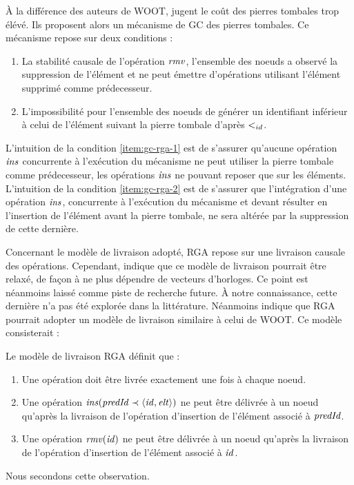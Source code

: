 À la différence des auteurs de WOOT, \textcite{ROH2011354} jugent le coût des pierres tombales trop élévé.
Ils proposent alors un mécanisme de \ac{GC} des pierres tombales.
Ce mécanisme repose sur deux conditions :
\begin{enumerate}[label=(\roman*)]
  \item \label{item:gc-rga-1}
    La stabilité causale de l'opération $\mathit{rmv}$, \ie l'ensemble des noeuds a observé la suppression de l'élément et ne peut émettre d'opérations utilisant l'élément supprimé comme prédecesseur.
  \item \label{item:gc-rga-2}
    L'impossibilité pour l'ensemble des noeuds de générer un identifiant inférieur à celui de l'élément suivant la pierre tombale d'après $<_{id}$.
\end{enumerate}
L'intuition de la condition \ref{item:gc-rga-1} est de s'assurer qu'aucune opération $\mathit{ins}$ concurrente à l'exécution du mécanisme ne peut utiliser la pierre tombale comme prédecesseur, les opérations $\mathit{ins}$ ne pouvant reposer que sur les éléments.
L'intuition de la condition \ref{item:gc-rga-2} est de s'assurer que l'intégration d'une opération $\mathit{ins}$, concurrente à l'exécution du mécanisme et devant résulter en l'insertion de l'élément avant la pierre tombale, ne sera altérée par la suppression de cette dernière.

Concernant le modèle de livraison adopté, \ac{RGA} repose sur une livraison causale des opérations.
Cependant, \cite{ROH2011354} indique que ce modèle de livraison pourrait être relaxé, de façon à ne plus dépendre de vecteurs d'horloges.
Ce point est néanmoins laissé comme piste de recherche future.
À notre connaissance, cette dernière n'a pas été explorée dans la littérature.
Néanmoins \textcite{2021-these-vic} indique que \ac{RGA} pourrait adopter un modèle de livraison similaire à celui de WOOT.
Ce modèle consisterait :
\begin{definition}
  Le modèle de livraison \ac{RGA} définit que :
  \begin{enumerate}[label=(\roman*)]
    \item Une opération doit être livrée exactement une fois à chaque noeud.
    \item Une opération $\mathit{ins}(\mathit{predId} \prec \langle \mathit{id},\mathit{elt} \rangle)$ ne peut être délivrée à un noeud qu'après la livraison de l'opération d'insertion de l'élément associé à $\mathit{predId}$.
    \item Une opération $\mathit{rmv}(\mathit{id})$ ne peut être délivrée à un noeud qu'après la livraison de l'opération d'insertion de l'élément associé à $\mathit{id}$.
  \end{enumerate}
\end{definition}
Nous secondons cette observation.

